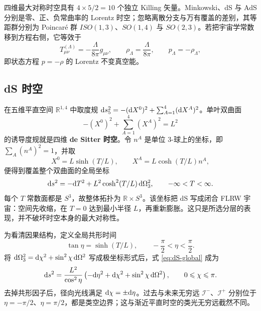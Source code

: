 四维最大对称时空具有 $4\times5/2=10$ 个独立 Killing 矢量。Minkowski、dS 与 AdS 分别是零、正、负常曲率的 Lorentz 时空；忽略离散分支与万有覆盖的差别，其等距群分别为 Poincar\'e 群 $ISO(1,3)$、$SO(1,4)$ 与 $SO(2,3)$。若把宇宙学常数移到方程右侧，它等效于
\[
    T^{(\Lambda)}_{\mu\nu}=-\frac{\Lambda}{8\pi}g_{\mu\nu},
    \qquad
    \rho_\Lambda=\frac{\Lambda}{8\pi},\qquad
    p_\Lambda=-\rho_\Lambda,
\]
即状态方程 $p=-\rho$ 的 Lorentz 不变真空能。

\subsection{dS 时空}

在五维平直空间 $\mathbb R^{1,4}$ 中取度规
$\dd s_5^2=-(\dd X^0)^2+\sum_{A=1}^4(\dd X^A)^2$。单叶双曲面
\begin{equation}\label{eq:dS-embedding}
    -(X^0)^2+\sum_{A=1}^4(X^A)^2=L^2
\end{equation}
的诱导度规就是四维 \textbf{de Sitter 时空}。令 $n^A$ 是单位 3-球上的坐标，即 $\sum_A(n^A)^2=1$，并取
\[
    X^0=L\sinh(T/L),\qquad
    X^A=L\cosh(T/L)n^A,
\]
便得到覆盖整个双曲面的全局坐标
\begin{equation}\label{eq:dS-global}
    \dd s^2=-\dd T^2+L^2\cosh^2(T/L)\,\dd\Omega_3^2,
    \qquad -\infty<T<\infty.
\end{equation}
每个 $T$ 常数面都是 $S^3$，故整体拓扑为 $\mathbb R\times S^3$。该坐标把 dS 写成闭合 FLRW 宇宙：空间先收缩，在 $T=0$ 达到最小半径 $L$，再重新膨胀。这只是所选分层的表现，并不破坏时空本身的最大对称性。

为看清因果结构，定义全局共形时间
\[
    \tan\eta=\sinh(T/L),\qquad
    -\frac\pi2<\eta<\frac\pi2.
\]
将 $\dd\Omega_3^2=\dd\chi^2+\sin^2\chi\,\dd\Omega^2$ 写成极坐标形式后，式 \eqref{eq:dS-global} 成为
\begin{equation}\label{eq:dS-conformal}
    \dd s^2=\frac{L^2}{\cos^2\eta}
      \left(-\dd\eta^2+\dd\chi^2+\sin^2\chi\,\dd\Omega^2\right),
    \qquad 0\leqslant\chi\leqslant\pi.
\end{equation}
去掉共形因子后，径向光线满足 $\dd\chi=\pm\dd\eta$。过去与未来无穷远 $\mathscr I^-$、$\mathscr I^+$ 分别位于 $\eta=-\pi/2$、$\eta=\pi/2$，都是类空边界；这与渐近平直时空的类光无穷远截然不同。

